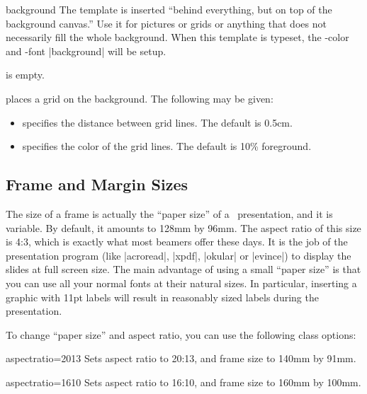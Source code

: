 \begin{element}{background}\yes\yes\yes
  The template is inserted ``behind everything, but on top of the background canvas.'' Use it for pictures or grids or anything that does not necessarily fill the whole background. When this template is typeset, the \beamer-color and -font |background| will be setup.

  \begin{templateoptions}
     is empty.

    places a grid on the background. The following  may be given:
    \begin{itemize}
      \item
       specifies the distance between grid lines. The default is 0.5cm.
      \item
       specifies the color of the grid lines. The default is 10\% foreground.
    \end{itemize}
  \end{templateoptions}
\end{element}


\subsection{Frame and Margin Sizes}

The size of a frame is actually the ``paper size'' of a \beamer\ presentation, and it is variable. By default, it amounts to 128mm by 96mm. The aspect ratio of this size is 4:3, which is exactly what most beamers offer these days. It is the job of the presentation program (like |acroread|, |xpdf|, |okular| or |evince|) to display the slides at full screen size. The main advantage of using a small ``paper size'' is that you can use all your normal fonts at their natural sizes. In particular, inserting a graphic with 11pt labels will result in reasonably sized labels during the presentation.

To change ``paper size'' and aspect ratio, you can use the following class options:

\begin{classoption}{aspectratio=2013}
  Sets aspect ratio to 20:13, and frame size to 140mm by 91mm.
\end{classoption}

\begin{classoption}{aspectratio=1610}
  Sets aspect ratio to 16:10, and frame size to 160mm by 100mm.
\end{classoption}

